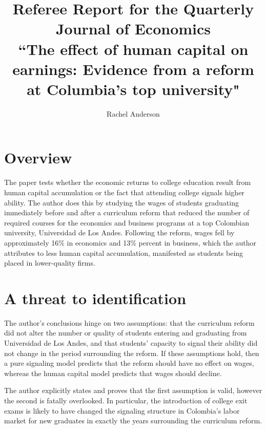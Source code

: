 \documentclass[a4paper, 11pt]{article}
\begin{document}

\title{Referee Report for the Quarterly Journal of Economics \\
\Large ``The effect of human capital on earnings: Evidence from a reform at Columbia's top university"}
\author{Rachel Anderson}
\maketitle

\section*{Overview}

The paper tests whether the economic returns to college education result from human capital accumulation or the fact that attending college signals higher ability.  The author does this by studying the wages of students graduating immediately before and after a curriculum reform that reduced the number of required courses for the economics and business programs at a top Colombian university, Universidad de Los Andes.  Following the reform, wages fell by approximately 16\% in economics and 13\% percent in business, which the author attributes to less human capital accumulation, manifested as students being placed in lower-quality firms.  



\section*{A threat to identification}

The author's conclusions hinge on two assumptions: that the curriculum reform did not alter the number or quality of students entering and graduating from Universidad de Los Andes, and that students' capacity to signal their ability did not change in the period surrounding the reform.  If these assumptions hold, then a pure signaling model predicts that the reform should have no effect on wages, whereas the human capital model predicts that wages should decline.  

The author explicitly states and proves that the first assumption is valid, however the second is fatally overlooked.  In particular, the introduction of college exit exams is likely to have changed the signaling structure in Colombia's labor market for new graduates in exactly the years surrounding the curriculum reform. 
\end{document}
